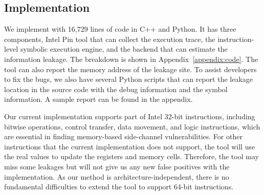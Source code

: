 \subsection{Implementation}
We implement \tool{} with 16,729 lines of code in C++ and Python. It has three
components, Intel Pin tool that can collect the execution trace, the
instruction-level symbolic execution engine, and the backend that can estimate
the information leakage. The breakdown is shown in
Appendix~\ref{appendix:code}. The tool can also report the memory address of
the leakage site. To assist developers to fix the bugs, we also have several
Python scripts that can report the leakage location in the source code with the
debug information and the symbol information. A sample report can be found in
the appendix.

Our current implementation supports part of Intel 32-bit instructions,
including bitwise operations, control transfer, data movement, and logic
instructions, which are essential in finding memory-based side-channel
vulnerabilities. For other instructions that the current implementation does not
support, the tool will use the real values to update the registers and memory
cells. Therefore, the tool may miss some leakages but will not give us any new
false positives with the implementation. As our method is architecture-independent,
there is no fundamental difficulties to extend the tool to support 64-bit
instructions. 

